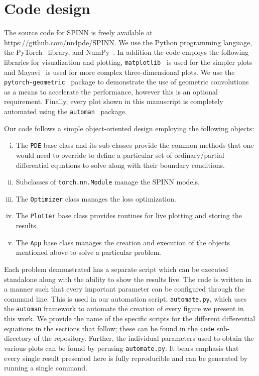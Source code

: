 \documentclass[12pt]{article}
\begin{document}
\section{Code design}

\begin{sloppypar}
The source code for SPINN is freely available at \url{https://github.com/nn4pde/SPINN}.  We use the Python programming language, the PyTorch~\cite{pytorch} library, and NumPy~\cite{numpy}.  In addition the code employs the following libraries for visualization and plotting, \verb|matplotlib|~\cite{mpl} is used for the simpler plots and Mayavi~\cite{mayavi} is used for more complex three-dimensional plots.  We use the \verb|pytorch-geometric|~\cite{pytorch_geometric} package to demonstrate the use of geometric convolutions as a means to accelerate the performance, however this is an optional requirement.  Finally, every plot shown in this manuscript is completely automated using the \verb|automan|~\cite{automan:2018} package.
\end{sloppypar}

Our code follows a simple object-oriented design employing the following objects:
\begin{enumerate}[(i)]
\item The \verb|PDE| base class and its sub-classes provide the common methods that one would need to override to define a particular set of ordinary/partial differential equations to solve along with their boundary conditions.
\item Subclasses of \verb|torch.nn.Module| manage the SPINN models.
\item The \verb|Optimizer| class manages the loss optimization.
\item The \verb|Plotter| base class provides routines for live plotting and storing the results.
\item The \verb|App| base class manages the creation and execution of the objects mentioned above to solve a particular problem.
\end{enumerate}

Each problem demonstrated has a separate script which can be executed standalone along with the ability to show the results live. The code is written in a manner such that every important parameter can be configured through the command line.  This is used in our automation script, \verb|automate.py|, which uses the \verb|automan| framework to automate the creation of every figure we present in this work.  We provide the name of the specific scripts for the different differential equations in the sections that follow; these can be found in the \verb|code| sub-directory of the repository. Further, the individual parameters used to obtain the various plots can be found by perusing \verb|automate.py|.  It bears emphasis that every single result presented here is fully reproducible and can be generated by running a single command.
\end{document}
